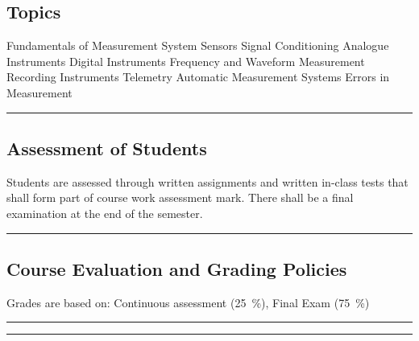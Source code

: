 \subsection*{Topics}
\begin{outline}
    \1 Fundamentals of Measurement System
    \1 Sensors
    \1 Signal Conditioning
    \1 Analogue Instruments
    \1 Digital Instruments
    \1 Frequency and Waveform Measurement
    \1 Recording Instruments
    \1 Telemetry
    \1 Automatic Measurement Systems
    \1 Errors in Measurement
\end{outline}
\vspace{2ex} \hrule\vspace{2ex}

\subsection*{Assessment of Students}
\begin{outline}
    \1 Students are assessed through written assignments and written in-class tests that shall form part of course work assessment mark.
    \1 There shall be a final examination at the end of the semester.
\end{outline}
\vspace{2ex}\hrule\vspace{2ex}

\subsection*{Course Evaluation and Grading Policies}
Grades are based on:
Continuous assessment (\qty{25}{\percent}),
Final Exam (\qty{75}{\percent})
\vspace{2ex}\hrule
\vspace{2ex}\hrule\vspace{2ex}



